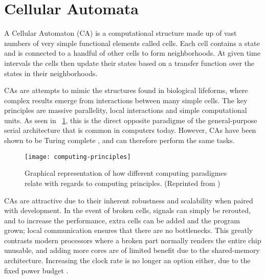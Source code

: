 
\section{Cellular Automata}

A Cellular Automaton (CA) is a computational structure made up of vast numbers of very simple functional elements called cells.
Each cell contains a state and is connected to a handful of other cells to form neighborhoods.
At given time intervals the cells then update their states based on a transfer function over the states in their neighborhoods.\footnotemark


CAs are attempts to mimic the structures found in biological lifeforms, where complex results emerge from interactions between many simple cells.
The key principles are massive parallelity, local interactions and simple computational units.
As seen in \figurename~\ref{fig:computing-principles}, this is the direct opposite paradigme of the general-purpose serial architecture that is common in computers today.
However, CAs have been shown to be Turing complete \cite{codd1968cellular, neumann1966selfreplication}, and can therefore perform the same tasks.

\begin{figure}[!ht]
    \centering
    \texttt{[image: computing-principles]}
    \caption[Computing principles]{
        Graphical representation of how different computing paradigmes relate with regards to computing principles.
        (Reprinted from \cite{sipper1999emergence})
    }
    \label{fig:computing-principles}
\end{figure}

CAs are attractive due to their inherent robustness and scalability when paired with development.
In the event of broken cells, signals can simply be rerouted, and to increase the performance, extra cells can be added and the program grown; local communication ensures that there are no bottlenecks.
This greatly contrasts modern processors where a broken part normally renders the entire chip unusable, and adding more cores are of limited benefit due to the shared-memory architecture.
Increasing the clock rate is no longer an option either, due to the fixed power budget .

